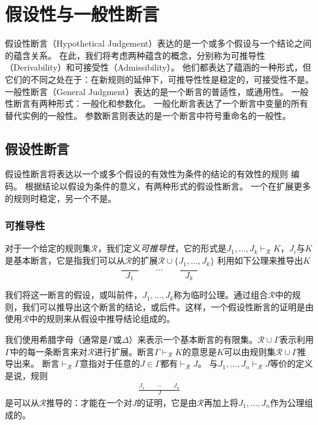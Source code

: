 \chapter{假设性与一般性断言}

假设性断言（Hypothetical Judgement）表达的是一个或多个假设与一个结论之间的蕴含关系。
在此，我们将考虑两种蕴含的概念，分别称为可推导性（Derivability）和可接受性（Admissibility）。
他们都表达了蕴涵的一种形式，但它们的不同之处在于：在新规则的延伸下，可推导性性是稳定的，可接受性不是。
一般性断言（General Judgment）表达的是一个断言的普适性，或通用性。
一般性断言有两种形式：一般化和参数化。
一般化断言表达了一个断言中变量的所有替代实例的一般性。
参数断言则表达的是一个断言中符号重命名的一般性。

\section{假设性断言}

假设性断言将表达以一个或多个假设的有效性为条件的结论的有效性的规则 编码。 
根据结论以假设为条件的意义，有两种形式的假设性断言。
一个在扩展更多的规则时稳定，另一个不是。

\subsection{可推导性}

对于一个给定的规则集$\mathcal{R}$，我们定义\textit{可推导性}，它的形式是$J_1,\dots,J_k\vdash_\mathcal{R}K $，$J_i$与$K$是基本断言，它是指我们可以从$\mathcal{R}$的扩展$\mathcal{R}\cup \{J_1,\dots,J_k\}$ 利用如下公理来推导出$K$
$$\frac{\qquad}{J_1} \qquad \cdots \qquad \frac{\qquad}{J_k}$$

我们将这一断言的假设，或叫前件，$J_1,\dots,J_k$称为临时公理。通过组合$\mathcal{R}$中的规则，我们可以推导出这个断言的结论，或后件。这样，一个假设性断言的证明是由使用$\mathcal{R}$中的规则来从假设中推导结论组成的。

我们使用希腊字母（通常是$\Gamma$或$\Delta$）来表示一个基本断言的有限集。$\mathcal{R}\cup\Gamma$表示利用$\Gamma$中的每一条断言来对$\mathcal{R}$进行扩展。断言$\Gamma \vdash_\mathcal{R}K$的意思是$K$可以由规则集$\mathcal{R}\cup\Gamma$推导出来。
断言$\vdash_\mathcal{R}\Gamma$意指对于任意的$J\in \Gamma$都有$\vdash_\mathcal{R}J$。
与$J_1,\dots,J_n\vdash_\mathcal{R}J$等价的定义是说，规则
\begin{equation}
    \begin{aligned} %
        \frac{J_1\qquad\cdots\qquad J_n}{J} \label{equation:three_one}
    \end{aligned}
\end{equation}
是可以从$\mathcal{R}$推导的：才能在一个对$J$的证明，它是由$\mathcal{R}$再加上将$J_1,\dots,J_n$作为公理组成的。

